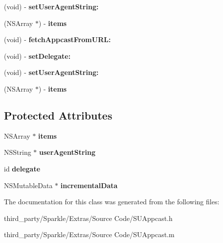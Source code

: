 \begin{DoxyCompactItemize}
\item 
\mbox{\label{interface_s_u_appcast_a02c4782fffbdde5c7fb129c052fa137e}} 
(void) -\/ {\bfseries set\+User\+Agent\+String\+:}
\item 
\mbox{\label{interface_s_u_appcast_acbc555a19434c2dd67fb8dc5a9f20db3}} 
(N\+S\+Array $\ast$) -\/ {\bfseries items}
\item 
\mbox{\label{interface_s_u_appcast_aba04b0ab1912cd464c55b1e0222dd542}} 
(void) -\/ {\bfseries fetch\+Appcast\+From\+U\+R\+L\+:}
\item 
\mbox{\label{interface_s_u_appcast_a8dfd25f317b47b1b0f4428d4be781c07}} 
(void) -\/ {\bfseries set\+Delegate\+:}
\item 
\mbox{\label{interface_s_u_appcast_a02c4782fffbdde5c7fb129c052fa137e}} 
(void) -\/ {\bfseries set\+User\+Agent\+String\+:}
\item 
\mbox{\label{interface_s_u_appcast_acbc555a19434c2dd67fb8dc5a9f20db3}} 
(N\+S\+Array $\ast$) -\/ {\bfseries items}
\end{DoxyCompactItemize}
\subsection*{Protected Attributes}
\begin{DoxyCompactItemize}
\item 
\mbox{\label{interface_s_u_appcast_a89a6a9a0d13529fbc5b038a614eb1f6b}} 
N\+S\+Array $\ast$ {\bfseries items}
\item 
\mbox{\label{interface_s_u_appcast_a1bcd623117ea17ebf73ec268babaf24d}} 
N\+S\+String $\ast$ {\bfseries user\+Agent\+String}
\item 
\mbox{\label{interface_s_u_appcast_abd74ce6cd190de1afc72b8c7ce90a689}} 
id {\bfseries delegate}
\item 
\mbox{\label{interface_s_u_appcast_ab5085f8bc368ae9ee95fb97802194885}} 
N\+S\+Mutable\+Data $\ast$ {\bfseries incremental\+Data}
\end{DoxyCompactItemize}


The documentation for this class was generated from the following files\+:\begin{DoxyCompactItemize}
\item 
third\+\_\+party/\+Sparkle/\+Extras/\+Source Code/S\+U\+Appcast.\+h\item 
third\+\_\+party/\+Sparkle/\+Extras/\+Source Code/S\+U\+Appcast.\+m\end{DoxyCompactItemize}

